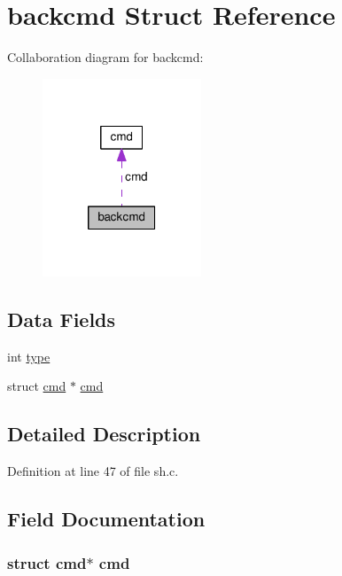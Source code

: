 \hypertarget{structbackcmd}{\section{backcmd Struct Reference}
\label{structbackcmd}
}


Collaboration diagram for backcmd\-:
\nopagebreak
\begin{figure}[H]
\begin{center}
\leavevmode
\includegraphics[width=134pt]{structbackcmd__coll__graph}
\end{center}
\end{figure}
\subsection*{Data Fields}
\begin{DoxyCompactItemize}
\item 
int \hyperlink{structbackcmd_ac765329451135abec74c45e1897abf26}{type}
\item 
struct \hyperlink{structcmd}{cmd} $\ast$ \hyperlink{structbackcmd_ae827072868c061a3985f9032a4522673}{cmd}
\end{DoxyCompactItemize}


\subsection{Detailed Description}


Definition at line 47 of file sh.\-c.



\subsection{Field Documentation}
\hypertarget{structbackcmd_ae827072868c061a3985f9032a4522673}{
\subsubsection[{cmd}]{\setlength{\rightskip}{0pt plus 5cm}struct {\bf cmd}$\ast$ {\bf cmd}}}\label{structbackcmd_ae827072868c061a3985f9032a4522673}



